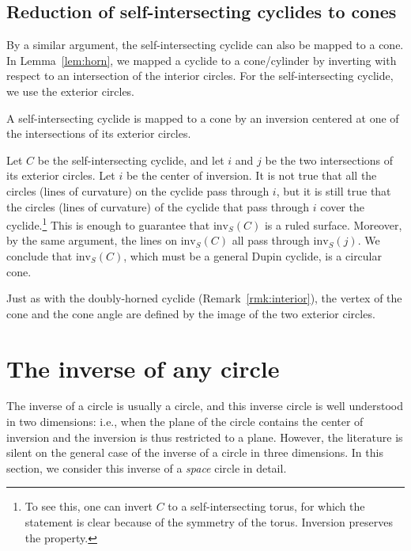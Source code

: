 \subsection{Reduction of self-intersecting cyclides to cones}
\label{sec:tocone}

By a similar argument, the self-intersecting cyclide can also 
be mapped to a cone.
In Lemma~\ref{lem:horn}, we mapped a cyclide to a cone/cylinder
by inverting with respect to an intersection of the interior circles.
For the self-intersecting cyclide, we use the exterior circles.

\begin{lemma}
A self-intersecting cyclide is mapped to a cone by an inversion centered
at one of the intersections of its exterior circles.
\end{lemma}
Let $C$ be the self-intersecting cyclide, 
and let $i$ and $j$ be the two intersections of its exterior circles.
Let $i$ be the center of inversion.
It is not true that all the circles (lines of curvature)
on the cyclide pass through $i$,
but it is still true that the circles
(lines of curvature) of the cyclide that pass through $i$ cover the 
cyclide.\footnote{To see this, one can invert $C$
	to a self-intersecting torus, for which the statement is clear
	because of the symmetry of the torus.  
	Inversion preserves the property.}
This is enough to guarantee that $\mbox{inv}_{S}(C)$ is a ruled surface.
Moreover, by the same argument, 
the lines on $\mbox{inv}_{S}(C)$ all pass through 
$\mbox{inv}_{S}(j)$.
We conclude that $\mbox{inv}_{S}(C)$, which must be a general Dupin cyclide,
is a circular cone.
\QED

\begin{rmk}
Just as with the doubly-horned cyclide (Remark~\ref{rmk:interior}),
the vertex of the cone and the cone angle are defined by the image
of the two exterior circles.
\end{rmk}


% 

\section{The inverse of any circle}
\label{sec1}

The inverse of a circle is usually a circle, and this
inverse circle is well understood in two dimensions: i.e., 
when the plane of the circle contains the center of inversion and
the inversion is thus restricted to a plane.
However, the literature is silent on the general case of the
inverse of a circle in three dimensions.
In this section, we consider this inverse of a {\em space} circle in detail.

